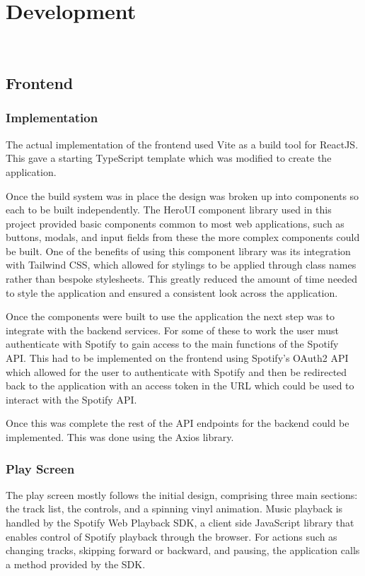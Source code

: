 \chapter{Development}~\label{cha:development}
\section{Frontend}
\subsection{Implementation}
The actual implementation of the frontend used Vite as a build tool for ReactJS. This gave a starting TypeScript template which was modified to create the application.

Once the build system was in place the design was broken up into components so each to be built independently. The HeroUI component library used in this project provided basic components common to most web applications, such as buttons, modals, and input fields from these the more complex components could be built. One of the benefits of using this component library was its integration with Tailwind CSS, which allowed for stylings to be applied through class names rather than bespoke stylesheets. This greatly reduced the amount of time needed to style the application and ensured a consistent look across the application.

Once the components were built to use the application the next step was to integrate with the backend services. For some of these to work the user must authenticate with Spotify to gain access to the main functions of the Spotify API. This had to be implemented on the frontend using Spotify's OAuth2 API which allowed for the user to authenticate with Spotify and then be redirected back to the application with an access token in the URL which could be used to interact with the Spotify API.

Once this was complete the rest of the API endpoints for the backend could be implemented. This was done using the Axios library.

\subsection{Play Screen}
The play screen mostly follows the initial design, comprising three main sections: the track list, the controls, and a spinning vinyl animation. Music playback is handled by the Spotify Web Playback SDK, a client side JavaScript library that enables control of Spotify playback through the browser. For actions such as changing tracks, skipping forward or backward, and pausing, the application calls a method provided by the SDK.

